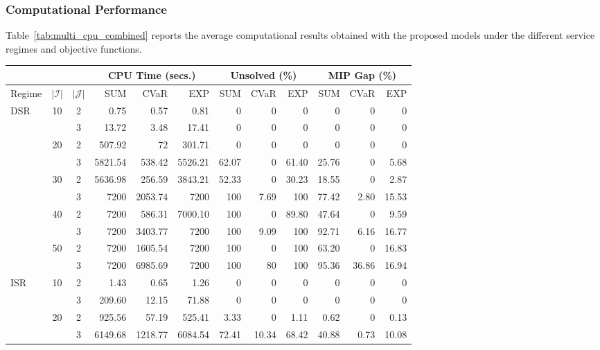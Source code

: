 \documentclass[a4paper,11pt,reqno]{amsart}
\newcommand{\J}{\mathcal{J}}
\begin{document}
\subsubsection*{Computational Performance}

Table~\ref{tab:multi_cpu_combined} reports the average computational results obtained with the proposed models under the different service regimes and objective functions.


\begin{table}[ht]
\centering
\begin{tabular}{p{0.7cm}cc|rrr|rrr|rrr}
\toprule
 && & \multicolumn{3}{c}{CPU Time (secs.)} &
 \multicolumn{3}{c}{Unsolved (\%)} &
 \multicolumn{3}{c}{MIP Gap (\%)}\\
\midrule
Regime & $|\mathcal I|$ & $|\J|$
& SUM & CVaR & EXP
& SUM & CVaR & EXP
& SUM & CVaR & EXP \\
\midrule
\multirow{10}{*}{DSR} & \multirow{2}{*}{10} & 2 & 0.75 & 0.57 & 0.81 & 0 & 0 & 0 & 0 & 0 & 0 \\
 &  & 3 & 13.72 & 3.48 & 17.41 & 0 & 0 & 0 & 0 & 0 & 0 \\
 & \multirow{2}{*}{20} & 2 & 507.92 & 72 & 301.71 & 0 & 0 & 0 & 0 & 0 & 0 \\
 &  & 3 & 5821.54 & 538.42 & 5526.21 & 62.07 & 0 & 61.40 & 25.76 & 0 & 5.68 \\
 & \multirow{2}{*}{30} & 2 & 5636.98 & 256.59 & 3843.21 & 52.33 & 0 & 30.23 & 18.55 & 0 & 2.87 \\
 &  & 3 &7200 & 2053.74 &7200 & 100 & 7.69 & 100 & 77.42 & 2.80 & 15.53 \\
 & \multirow{2}{*}{40} & 2 &7200 & 586.31 & 7000.10 & 100 & 0 & 89.80 & 47.64 & 0 & 9.59 \\
 &  & 3 &7200 & 3403.77 &7200 & 100 & 9.09 & 100 & 92.71 & 6.16 & 16.77 \\
 & \multirow{2}{*}{50} & 2 &7200 & 1605.54 &7200 & 100 & 0 & 100 & 63.20 & 0 & 16.83 \\
 &  & 3 &7200 & 6985.69 &7200 & 100 & 80 & 100 & 95.36 & 36.86 & 16.94 \\\midrule
\multirow{10}{*}{ISR} & \multirow{2}{*}{10} & 2 & 1.43 & 0.65 & 1.26 & 0 & 0 & 0 & 0 & 0 & 0 \\
 &  & 3 & 209.60 & 12.15 & 71.88 & 0 & 0 & 0 & 0 & 0 & 0 \\
 & \multirow{2}{*}{20} & 2 & 925.56 & 57.19 & 525.41 & 3.33 & 0 & 1.11 & 0.62 & 0 & 0.13 \\
 &  & 3 & 6149.68 & 1218.77 & 6084.54 & 72.41 & 10.34 & 68.42 & 40.88 & 0.73 & 10.08 \\

\end{tabular}
\end{table}
\end{document}
